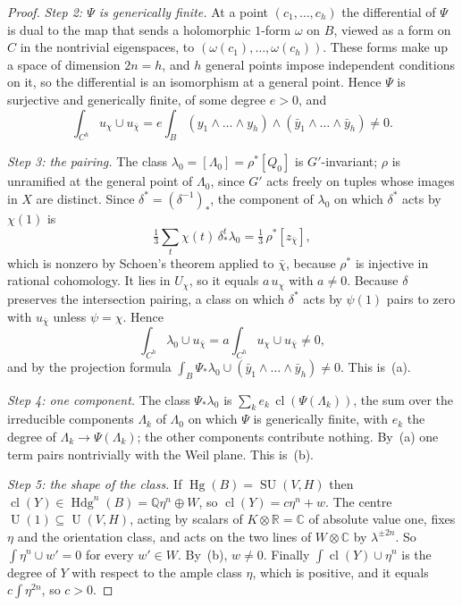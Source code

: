 \documentclass[11pt]{amsart}
\theoremstyle{definition}
\theoremstyle{remark}
\newcommand{\QQ}{\mathbb{Q}}
\newcommand{\RR}{\mathbb{R}}
\newcommand{\CC}{\mathbb{C}}
\newcommand{\Hdg}{\operatorname{Hdg}}
\newcommand{\Hg}{\operatorname{Hg}}
\newcommand{\SU}{\operatorname{SU}}
\newcommand{\U}{\operatorname{U}}
\newcommand{\cl}{\operatorname{cl}}
\begin{document}
\begin{proof}
\emph{Step 2: $\Psi$ is generically finite.} At a point
$(c_{1},\dots,c_{h})$ the differential of $\Psi$ is dual to the map that
sends a holomorphic $1$-form $\omega$ on $B$, viewed as a form on $C$ in the
nontrivial eigenspaces, to $(\omega(c_{1}),\dots,\omega(c_{h}))$. These forms
make up a space of dimension $2n=h$, and $h$ general points impose independent
conditions on it, so the differential is an isomorphism at a general point.
Hence $\Psi$ is surjective and generically finite, of some degree $e>0$, and
\[
  \int_{C^{h}}u_{\chi}\cup u_{\bar\chi}
  =e\int_{B}(y_{1}\wedge\dots\wedge y_{h})\wedge(\bar y_{1}\wedge\dots\wedge\bar y_{h})\ne0.
\]

\emph{Step 3: the pairing.} The class $\lambda_{0}=[\Lambda_{0}]=\rho^{*}[Q_{0}]$
is $G'$-invariant; $\rho$ is unramified at the general point of
$\Lambda_{0}$, since $G'$ acts freely on tuples whose images in $X$ are
distinct. Since $\delta^{*}=(\delta^{-1})_{*}$, the component of
$\lambda_{0}$ on which $\delta^{*}$ acts by $\chi(1)$ is
\[
  \tfrac13\sum_{t}\chi(t)\,\delta^{t}_{*}\lambda_{0}
  =\tfrac13\,\rho^{*}[z_{\bar\chi}],
\]
which is nonzero by Schoen's theorem applied to $\bar\chi$, because
$\rho^{*}$ is injective in rational cohomology. It lies in $U_{\chi}$, so it
equals $a\,u_{\chi}$ with $a\ne0$. Because $\delta$ preserves the
intersection pairing, a class on which $\delta^{*}$ acts by $\psi(1)$ pairs
to zero with $u_{\bar\chi}$ unless $\psi=\chi$. Hence
\[
  \int_{C^{h}}\lambda_{0}\cup u_{\bar\chi}=a\int_{C^{h}}u_{\chi}\cup u_{\bar\chi}\ne0,
\]
and by the projection formula
$\int_{B}\Psi_{*}\lambda_{0}\cup(\bar y_{1}\wedge\dots\wedge\bar y_{h})\ne0$.
This is~(a).

\emph{Step 4: one component.} The class $\Psi_{*}\lambda_{0}$ is
$\sum_{k}e_{k}\,\cl(\Psi(\Lambda_{k}))$, the sum over the irreducible
components $\Lambda_{k}$ of $\Lambda_{0}$ on which $\Psi$ is generically
finite, with $e_{k}$ the degree of $\Lambda_{k}\to\Psi(\Lambda_{k})$; the
other components contribute nothing. By~(a) one term pairs nontrivially with
the Weil plane. This is~(b).

\emph{Step 5: the shape of the class.} If $\Hg(B)=\SU(V,H)$ then
$\cl(Y)\in\Hdg^{n}(B)=\QQ\eta^{n}\oplus W$, so $\cl(Y)=c\eta^{n}+w$. The
centre $\U(1)\subseteq\U(V,H)$, acting by scalars of $K\otimes\RR=\CC$ of
absolute value one, fixes $\eta$ and the orientation class, and acts on the
two lines of $W\otimes\CC$ by $\lambda^{\pm2n}$. So $\int\eta^{n}\cup w'=0$
for every $w'\in W$. By~(b), $w\ne0$. Finally
$\int\cl(Y)\cup\eta^{n}$ is the degree of $Y$ with respect to the ample class
$\eta$, which is positive, and it equals $c\int\eta^{2n}$, so $c>0$.
\end{proof}
\end{document}
